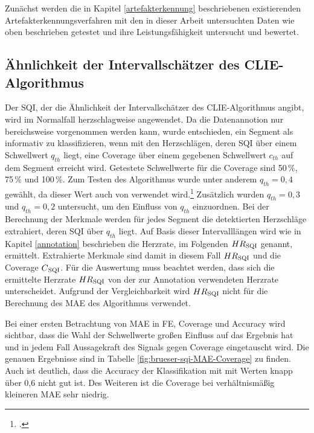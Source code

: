 Zunächst werden die in Kapitel \ref{artefakterkennung} beschriebenen existierenden Artefakterkennungsverfahren mit den in dieser Arbeit untersuchten Daten wie oben beschrieben getestet und ihre Leistungsfähigkeit untersucht und bewertet.

\subsection{Ähnlichkeit der Intervallschätzer des CLIE-Algorithmus}

Der \ac{SQI}, der die Ähnlichkeit der Intervallschätzer des \ac{CLIE}-Algorithmus angibt, wird im Normalfall herzschlagweise angewendet. Da die Datenannotion nur bereichsweise vorgenommen werden kann, wurde entschieden, ein Segment als informativ zu klassifizieren, wenn mit den Herzschlägen, deren \ac{SQI} über einem Schwellwert $q_{th}$ liegt, eine Coverage über einem gegebenen Schwellwert $c_{th}$ auf dem Segment erreicht wird. %
Getestete Schwellwerte für die Coverage sind 50\,\%, 75\,\% und 100\,\%. Zum Testen des Algorithmus wurde unter anderem $q_{th} = 0{,}4$ gewählt, da dieser Wert auch von \citeauthor{Zink2017} verwendet wird.\footcite[]{Zink2017} Zusätzlich wurden $q_{th} = 0{,}3$ und $q_{th} = 0{,}2$ untersucht, um den Einfluss von $q_{th}$ einzuordnen. Bei der Berechnung der Merkmale werden für jedes Segment die detektierten Herzschläge extrahiert, deren \ac{SQI} über $q_{th}$ liegt. Auf Basis dieser Intervalllängen wird wie in Kapitel \ref{annotation} beschrieben die Herzrate, im Folgenden $HR\textsubscript{SQI}$ genannt, ermittelt. Extrahierte Merkmale sind damit in diesem Fall $HR\textsubscript{SQI}$ und die Coverage $C\textsubscript{SQI}$. Für die Auswertung muss beachtet werden, dass sich die ermittelte Herzrate $HR\textsubscript{SQI}$ von der zur Annotation verwendeten Herzrate unterscheidet. Aufgrund der Vergleichbarkeit wird $HR\textsubscript{SQI}$ nicht für die Berechnung des \ac{MAE} des Algorithmus verwendet.

Bei einer ersten Betrachtung von \ac{MAE} in \si{FE}, Coverage und Accuracy wird sichtbar, dass die Wahl der Schwellwerte großen Einfluss auf das Ergebnis hat und in jedem Fall Aussagekraft des Signals gegen Coverage eingetauscht wird. Die genauen Ergebnisse sind in Tabelle \ref{fig:brueser-sqi-MAE-Coverage} zu finden. Auch ist deutlich, dass die Accuracy der Klassifikation mit mit Werten knapp über 0{,}6 nicht gut ist. Des Weiteren ist die Coverage bei verhältnismäßig kleineren \ac{MAE} sehr niedrig.
 
